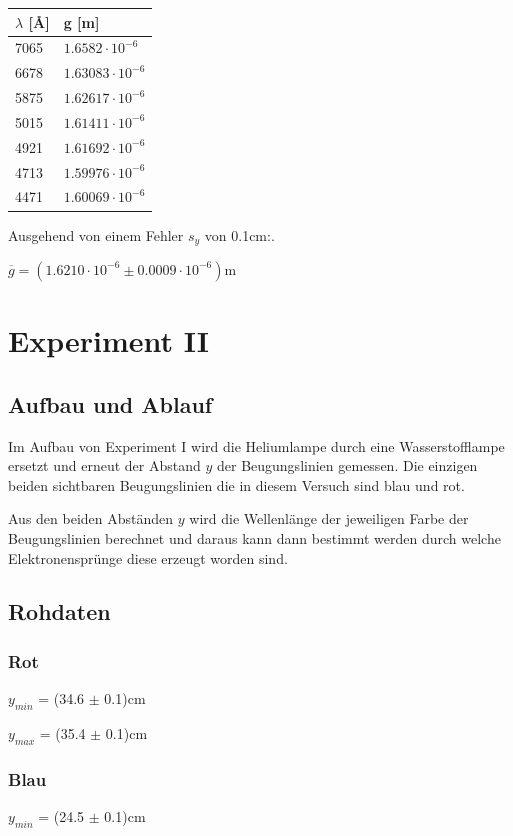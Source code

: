 \documentclass[12pt,a4paper]{article}
\begin{document}
\begin{tabular}{|l|l|}
\hline
$\lambda$ [\AA]&g [m]\\
\hline
7065&$1.6582\cdot 10^{-6}$\\
6678&$1.63083\cdot 10^{-6}$\\
5875&$1.62617\cdot 10^{-6}$\\
5015&$1.61411\cdot 10^{-6}$\\
4921&$1.61692\cdot 10^{-6}$\\
4713&$1.59976\cdot 10^{-6}$\\
4471&$1.60069\cdot 10^{-6}$\\
\hline
\end{tabular}\vspace{10pt}

Ausgehend von einem Fehler $s_y$ von 0.1cm:.\vspace{5pt}

$\overline{g} = (1.6210\cdot 10^{-6} \pm 0.0009\cdot 10^{-6})$m

\section*{Experiment II}

\subsection*{Aufbau und Ablauf}
Im Aufbau von Experiment I wird die Heliumlampe durch eine Wasserstofflampe ersetzt und erneut der Abstand $y$ der Beugungslinien gemessen. Die einzigen beiden sichtbaren Beugungslinien die in diesem Versuch sind blau und rot.

Aus den beiden Abst\"anden $y$ wird die Wellenl\"ange der jeweiligen Farbe der Beugungslinien berechnet und daraus kann dann bestimmt werden durch welche Elektronenspr\"unge diese erzeugt worden sind.

\subsection*{Rohdaten}
\subsubsection*{Rot}
$y_{min}$ = (34.6 $\pm$ 0.1)cm

$y_{max}$ = (35.4 $\pm$ 0.1)cm

\subsubsection*{Blau}
$y_{min}$ = (24.5 $\pm$ 0.1)cm
\end{document}
